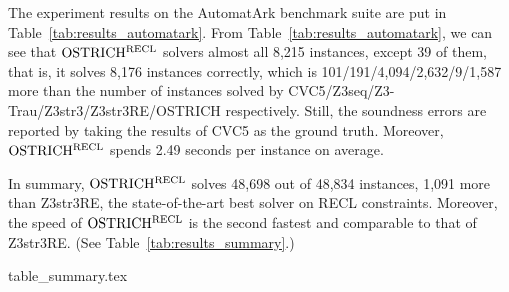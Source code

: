 The experiment results on the AutomatArk benchmark suite are put in Table~\ref{tab:results_automatark}. 
From Table~\ref{tab:results_automatark}, we can see that $\rm OSTRICH^{RECL}$ solvers almost all 8,215 instances, except 39 of them, that is, it solves 8,176 instances correctly, which is %
101/191/4,094/2,632/9/1,587
more than the number of instances solved by CVC5/Z3seq/Z3-Trau/Z3str3/Z3str3RE/OSTRICH respectively. 
%    
Still, the soundness errors are reported by taking the results of CVC5 as the ground truth.
%
Moreover, $\rm OSTRICH^{RECL}$ spends 2.49 seconds per instance on average. 

In summary, $\rm OSTRICH^{RECL}$ solves 48,698 out of 48,834 instances, 1,091 more than Z3str3RE, the state-of-the-art best solver on RECL constraints. Moreover, the speed of $\rm OSTRICH^{RECL}$ is the second fastest and comparable to that of Z3str3RE. (See Table~\ref{tab:results_summary}.)

\begin{table}[ht]
\vspace{-3mm}
\begin{center}
  {table_summary.tex}
\end{center}
  \caption{Experiment results: A Summary}
  \label{tab:results_summary}
\vspace{-6mm}
\end{table}





